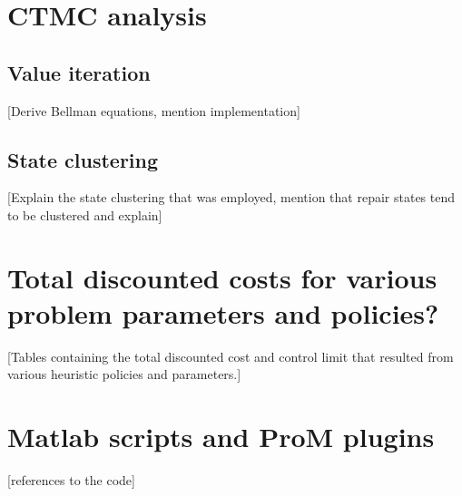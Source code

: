 \begin{appendices}
	
	
\chapter{CTMC analysis}
\section{Value iteration}
[Derive Bellman equations, mention implementation]
\section{State clustering}
[Explain the state clustering that was employed, mention that repair states tend to be clustered and explain]
\chapter{Total discounted costs for various problem parameters and policies?}\label{AppendixComputationsTable}
[Tables containing the total discounted cost and control limit that resulted from various heuristic policies and parameters.]
\chapter{Matlab scripts and ProM plugins}
[references to the code]
\end{appendices}
